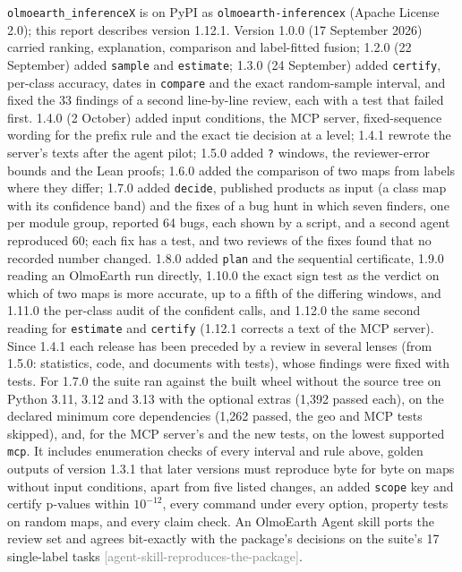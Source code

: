 \documentclass[11pt,a4paper]{article}
\newcommand{\claim}[1]{{\scriptsize\textsf{\textcolor{gray}{[#1]}}}}
\newcommand{\pkg}{\texttt{olmoearth\_inferenceX}}
\newcommand{\code}[1]{\texttt{#1}}
\begin{document}
\pkg{} is on PyPI as \code{olmoearth-inferencex} (Apache License 2.0); this report describes version 1.12.1.
Version 1.0.0 (17 September 2026) carried ranking, explanation, comparison and label-fitted fusion; 1.2.0 (22 September)
added \code{sample} and \code{estimate}; 1.3.0 (24 September) added \code{certify}, per-class accuracy, dates in
\code{compare} and the exact random-sample interval, and fixed the 33 findings of a second line-by-line review, each
with a test that failed first. 1.4.0 (2 October) added input conditions, the MCP server, fixed-sequence wording for the
prefix rule and the exact tie decision at a level; 1.4.1 rewrote the server's texts after the agent pilot; 1.5.0 added
\code{?} windows, the reviewer-error bounds and the Lean proofs; 1.6.0 added the comparison of two maps from labels
where they differ; 1.7.0 added \code{decide}, published products as input (a class map with its confidence band) and
the fixes of a bug hunt in which seven finders, one per module group, reported 64 bugs, each shown by a script, and a
second agent reproduced 60; each fix has a test, and two reviews of the fixes found that no recorded number changed.
1.8.0 added \code{plan} and the sequential certificate, 1.9.0 reading an OlmoEarth run directly, 1.10.0 the exact
sign test as the verdict on which of two maps is more accurate, up to a fifth of the differing windows, and 1.11.0 the
per-class audit of the confident calls, and 1.12.0 the same second reading for \code{estimate} and \code{certify} (1.12.1 corrects a text of the MCP server).
Since 1.4.1 each release has been preceded by a review in several lenses (from 1.5.0: statistics, code, and documents
with tests), whose findings were fixed with tests. For 1.7.0 the suite ran against the built wheel without the source
tree on Python 3.11, 3.12 and 3.13 with the optional extras (1,392 passed each), on the declared minimum core
dependencies (1,262 passed, the geo and MCP tests skipped), and, for the MCP server's and the new tests, on the lowest
supported \code{mcp}. It includes enumeration checks of every interval and rule above, golden outputs of version 1.3.1 that later
versions must reproduce byte for byte on maps without input conditions, apart from five listed changes, an added
\code{scope} key and certify p-values within $10^{-12}$, every command under every option, property tests on random maps, and every claim
check. An OlmoEarth Agent skill ports the review set and agrees
bit-exactly with the package's decisions on the suite's 17 single-label tasks \claim{agent-skill-reproduces-the-package}.
\end{document}

